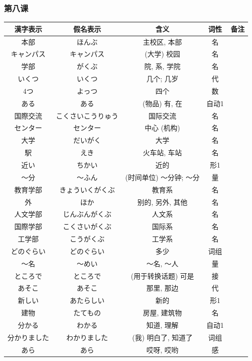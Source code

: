 \subsubsection{第八课}
\begin{longtable}{|c|c|c|c|c|}
    \hline
漢字表示 & 假名表示  & 含义 & 词性 & 备注 \\ \hline\hline  
本部 & ほんぶ & 主校区, 本部 & 名 & \\ \hline
キャンパス & キャンパス & (大学) 校园 & 名 & \\ \hline
学部 & がくぶ & 院, 系, 学院 & 名 & \\ \hline
いくつ & いくつ & 几个; 几岁 & 代 & \\ \hline
4つ & よっつ & 四个 & 数 & \\ \hline
ある & ある & (物品) 有, 在 & 自动1 & \\ \hline
国際交流 & こくさいこうりゅう & 国际交流 & 名 & \\ \hline
センター & センター & 中心 (机构) & 名 & \\ \hline
大学 & だいがく & 大学 & 名 & \\ \hline
駅 & えき & 火车站, 车站 & 名 & \\ \hline
近い & ちかい & 近的 & 形1 & \\ \hline
〜分 & 〜ふん & (时间单位) 〜分钟; 〜分 & 量 & \\ \hline
教育学部 & きょういくがくぶ & 教育系 & 名 & \\ \hline
外 & ほか & 别的, 另外, 其他 & 名 & \\ \hline
人文学部 & じんぶんがくぶ & 人文系 & 名 & \\ \hline
国際学部 & こくさいがくぶ & 国际系 & 名 & \\ \hline
工学部 & こうがくぶ & 工学系 & 名 & \\ \hline
どのぐらい & どのぐらい & 多少 & 词组 & \\ \hline
〜名 & 〜めい & 〜名, 〜人 & 量 & \\ \hline
ところで & ところで & (用于转换话题) 可是 & 接 & \\ \hline
あそこ & あそこ & 那里, 那边 & 代 & \\ \hline
新しい & あたらしい & 新的 & 形1 & \\ \hline
建物 & たてもの & 房屋, 建筑物 & 名 & \\ \hline
分かる & わかる & 知道, 理解 & 自动1 & \\ \hline
分かりました & わかりました & (我) 明白了, 知道了 & 词组 & \\ \hline
あら & あら & 哎呀, 哎哟 & 感 & \\ \hline

\end{longtable}
